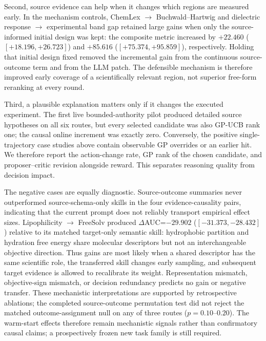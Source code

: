 Second, source evidence can help when it changes which regions are measured
early. In the mechanism controls, ChemLex $\rightarrow$ Buchwald--Hartwig and
dielectric response $\rightarrow$ experimental band gap retained large gains
when only the source-informed initial design was kept: the composite metric
increased by $+22.460$ ($[+18.196,+26.723]$) and $+85.616$
($[+75.374,+95.859]$), respectively. Holding that initial design fixed removed
the incremental gain from the continuous source-outcome term and from the LLM
patch. The defensible mechanism is therefore improved early coverage of a
scientifically relevant region, not superior free-form reranking at every
round.

Third, a plausible explanation matters only if it changes the executed
experiment. The first live bounded-authority pilot produced detailed source
hypotheses on all six routes, but every selected candidate was also GP-UCB rank
one; the causal online increment was exactly zero. Conversely, the positive
single-trajectory case studies above contain observable GP overrides or an
earlier hit. We therefore report the action-change rate, GP rank of the chosen
candidate, and proposer--critic revision alongside reward. This separates
reasoning quality from decision impact.

The negative cases are equally diagnostic. Source-outcome summaries never
outperformed source-schema-only skills in the four evidence-causality pairs,
indicating that the current prompt does not reliably transport empirical
effect sizes. Lipophilicity $\rightarrow$ FreeSolv produced
$\Delta$AUC=$-29.902$ ($[-31.373,-28.432]$) relative to its matched target-only
semantic skill: hydrophobic partition and hydration free energy share molecular
descriptors but not an interchangeable objective direction. Thus gains are
most likely when a shared descriptor has the same scientific role, the
transferred skill changes early sampling, and subsequent target evidence is
allowed to recalibrate its weight. Representation mismatch, objective-sign
mismatch, or decision redundancy predicts no gain or negative transfer. These
mechanistic interpretations are supported by retrospective ablations; the
completed source-outcome permutation test did not reject the matched
outcome-assignment null on any of three routes ($p=0.10$--$0.20$). The warm-start
effects therefore remain mechanistic signals rather than confirmatory causal
claims; a prospectively frozen new task family is still required.

